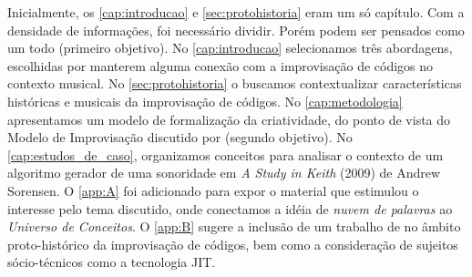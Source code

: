 Inicialmente, os \autoref{cap:introducao} e \autoref{sec:protohistoria} eram um só capítulo. Com a densidade de informações, foi necessário dividir. Porém podem ser pensados como um todo (primeiro objetivo). No \autoref{cap:introducao} selecionamos três abordagens, escolhidas por manterem alguma conexão com a improvisação de códigos no contexto musical.  No \autoref{sec:protohistoria} o buscamos contextualizar características históricas e musicais da improvisação de códigos. No \autoref{cap:metodologia} apresentamos um modelo de formalização da criatividade, do ponto de vista do Modelo de Improvisação discutido por  (segundo objetivo). No \autoref{cap:estudos_de_caso}, organizamos conceitos para analisar o contexto de um algoritmo gerador de uma sonoridade em \emph{A Study in Keith} (2009) de Andrew Sorensen.  O \autoref{app:A} foi adicionado para expor o material que estimulou o interesse pelo tema discutido, onde conectamos a idéia de \emph{nuvem de palavras} ao \emph{Universo de Conceitos}. O \autoref{app:B} sugere a inclusão de um trabalho de  no âmbito proto-histórico da improvisação de códigos, bem como a consideração de sujeitos sócio-técnicos como a tecnologia JIT.
